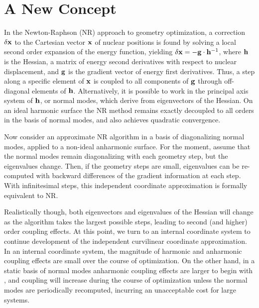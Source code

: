 \documentclass[prl,twocolumn,showpacs,twocolumngrid,superbib]{revtex4}
\begin{document}
\section{A New Concept} \label{concept}

In the Newton-Raphson (NR) approach to geometry optimization, a correction $\delta {\bf x}$  to the 
Cartesian vector $\bf x$ of nuclear positions is found by solving a local second order expansion of the 
energy function, yielding  $\delta {\bf x}  = - {\bf g}\cdot {\bf h}^{-1}$,  where $\bf h$ 
is the Hessian, a matrix of energy second derivatives with respect to nuclear displacement,
and $\bf g$ is the gradient vector of energy first derivatives.  Thus, 
a step along a specific element of $\bf x$ is coupled to all components of $\bf g$ through off-diagonal 
elements of $\bf h$.  Alternatively, it is possible to work in the principal axis system of $\bf h$, or 
normal modes,  which derive from eigenvectors of the Hessian.  On an ideal harmonic surface the NR method 
remains exactly decoupled to all orders in the basis of normal modes, and also achieves quadratic convergence.  

Now consider an approximate NR algorithm in a basis of diagonalizing normal modes,  applied to a 
non-ideal anharmonic surface.  For the moment,  assume that the normal modes remain diagonalizing with each
geometry step, but the eigenvalues change.  Then, if the geometry steps are small,
eigenvalues can be re-computed with backward differences of the gradient information at each step. 
With infinitesimal steps, this independent coordinate approximation is formally equivalent to NR.  

Realistically though, both eigenvectors and eigenvalues of the Hessian will change as the 
algorithm takes the largest possible steps, leading to second (and higher) order coupling effects.  At this point, 
we turn to an internal coordinate system to continue development of the independent curvilinear coordinate 
approximation.  In an internal coordinate system, the magnitude of harmonic and anharmonic coupling
effects are small over the course of optimization.  On the other hand,
in a static basis of normal modes anharmonic coupling effects are larger to begin with \cite{fogarasi_diaghess}, 
and coupling will increase during the course of optimization unless the normal modes are 
periodically recomputed, incurring an unacceptable cost for large systems.  
\end{document}
